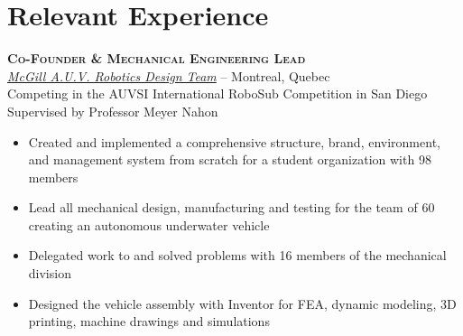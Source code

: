 \documentclass[12pt, letterpaper]{article}
\newcommand{\years}[1]{\marginnote{\footnotesize #1}} %
\begin{document}
\section*{Relevant Experience}

	\begin{samepage}
		\years{8/2013 - Present} \textbf{\scshape Co-Founder \& Mechanical Engineering Lead}\\
		\href {http://www.mcgillrobotics.com}{\textit{McGill A.U.V. Robotics Design Team}} -- Montreal, Quebec\\
		{\small Competing in the AUVSI International RoboSub Competition in San Diego}\\
		{\small Supervised by Professor Meyer Nahon }
		\begin{itemize}
			\item Created and implemented a comprehensive structure, brand, environment, and management system from scratch for a student organization with 98 members
			\item Lead all mechanical design, manufacturing and testing for the team of 60 creating an autonomous underwater vehicle 
			\item Delegated work to and solved problems with 16 members of the mechanical division
			\item Designed the vehicle assembly with Inventor for FEA, dynamic modeling, 3D printing, machine drawings and simulations
		\end{itemize}
	\end{samepage}
\end{document}
